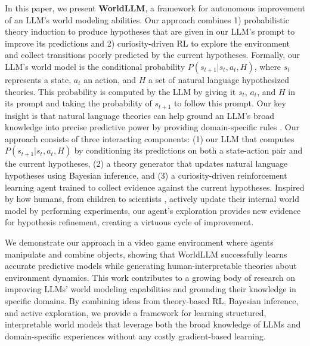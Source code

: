 \documentclass{article}
\begin{document}
In this paper, we present \textbf{WorldLLM}, a framework for autonomous improvement of an LLM's world modeling abilities. Our approach combines 1) probabilistic theory induction to produce hypotheses that are given in our LLM's prompt to improve its predictions and 2) curiosity-driven RL to explore the environment and collect transitions poorly predicted by the current hypotheses. Formally, our LLM's world model is the conditional probability $P(s_{t+1}|s_t, a_t, H)$, where $s_t$ represents a state, $a_t$ an action, and $H$ a set of natural language hypothesized theories. This probability is computed by the LLM by giving it $s_t$, $a_t$, and $H$ in its prompt and taking the probability of $s_{t+1}$ to follow this prompt. Our key insight is that natural language theories can help ground an LLM's broad knowledge into precise predictive power by providing domain-specific rules \citep{zhang_language-guided_2024}. Our approach consists of three interacting components: (1) our LLM that computes $P(s_{t+1}|s_t, a_t, H)$ by conditioning its predictions on both a state-action pair and the current hypotheses, (2) a theory generator that updates natural language hypotheses using Bayesian inference, and (3) a curiosity-driven reinforcement learning agent trained to collect evidence against the current hypotheses. Inspired by how humans, from children to scientists \citep{piaget_construction_1954,gopnik_words_1997}, actively update their internal world model by performing experiments, our agent's exploration provides new evidence for hypothesis refinement, creating a virtuous cycle of improvement.


We demonstrate our approach in a video game environment where agents manipulate and combine objects, showing that WorldLLM successfully learns accurate predictive models while generating human-interpretable theories about environment dynamics. This work contributes to a growing body of research on improving LLMs' world modeling capabilities and grounding their knowledge in specific domains. By combining ideas from theory-based RL, Bayesian inference, and active exploration, we provide a framework for learning structured, interpretable world models that leverage both the broad knowledge of LLMs and domain-specific experiences without any costly gradient-based learning.
\end{document}
